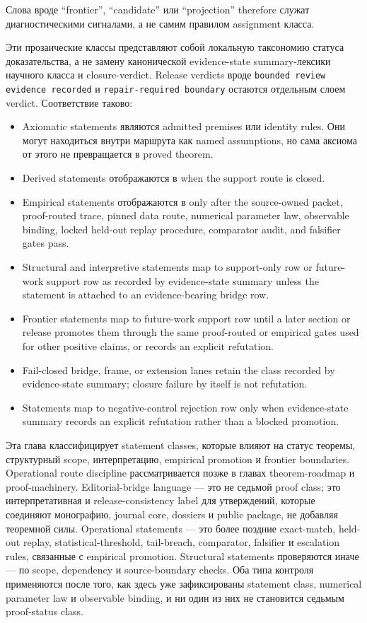Слова вроде ``frontier'', ``candidate'' или ``projection'' therefore
служат диагностическими сигналами, а не самим правилом assignment класса.

Эти прозаические классы представляют собой локальную таксономию статуса
доказательства, а не замену канонической evidence-state summary-лексики научного класса и
closure-verdict. Release verdicts вроде \texttt{bounded review evidence recorded} и
\texttt{repair-required boundary} остаются отдельным слоем verdict. Соответствие таково:
\begin{itemize}
\item Axiomatic statements являются admitted premises или identity rules. Они
      могут находиться внутри маршрута  как named
      assumptions, но сама аксиома от этого не превращается в proved theorem.
\item Derived statements отображаются в  when the
      support route is closed.
\item Empirical statements отображаются в  only after
      the source-owned packet, proof-routed trace, pinned data route,
      numerical parameter law, observable binding, locked held-out replay
      procedure, comparator audit, and falsifier gates pass.
\item Structural and interpretive statements map to support-only row or
      future-work support row as recorded by evidence-state summary unless the statement is attached
      to an evidence-bearing bridge row.
\item Frontier statements map to future-work support row until a later section or
      release promotes them through the same proof-routed or empirical gates
      used for other positive claims, or records an explicit refutation.
\item Fail-closed bridge, frame, or extension lanes retain the class recorded
      by evidence-state summary; closure failure by itself is not refutation.
\item Statements map to negative-control rejection row only when evidence-state summary records an explicit
      refutation rather than a blocked promotion.
\end{itemize}
Эта глава классифицирует statement classes, которые влияют на статус
теоремы, структурный scope, интерпретацию, empirical promotion и
frontier boundaries.
Operational route discipline рассматривается позже в главах theorem-roadmap и
proof-machinery.
Editorial-bridge language — это не седьмой proof class; это
интерпретативная и release-consistency label для утверждений, которые
соединяют монографию, journal core, dossiers и public package, не добавляя
теоремной силы.
Operational statements — это более поздние exact-match, held-out replay,
statistical-threshold, tail-breach, comparator, falsifier и escalation rules,
связанные с empirical promotion. Structural statements проверяются иначе — по
scope, dependency и source-boundary checks. Оба типа контроля применяются
после того, как здесь уже зафиксированы statement class, numerical parameter
law и observable binding, и ни один из них не становится седьмым proof-status
class.

